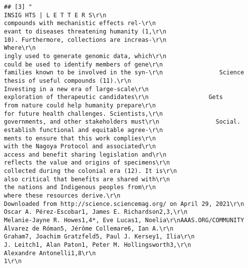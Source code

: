 \documentclass[
]{book}
\begin{document}
\begin{verbatim}
## [3] "                                                              INSIG HTS | L E T T E R S\r\n                                                              compounds with mechanistic effects rel-\r\n                                                              evant to diseases threatening humanity (1,\r\n                                                              10). Furthermore, collections are increas-\r\n                 Where\r\n                                                              ingly used to generate genomic data, which\r\n                                                              could be used to identify members of gene\r\n                                                              families known to be involved in the syn-\r\n                Science                                       thesis of useful compounds (11).\r\n                                                                 Investing in a new era of large-scale\r\n                                                              exploration of therapeutic candidates\r\n                 Gets                                         from nature could help humanity prepare\r\n                                                              for future health challenges. Scientists,\r\n                                                              governments, and other stakeholders must\r\n                Social.                                       establish functional and equitable agree-\r\n                                                              ments to ensure that this work complies\r\n                                                              with the Nagoya Protocol and associated\r\n                                                              access and benefit sharing legislation and\r\n                                                              reflects the value and origins of specimens\r\n                                                              collected during the colonial era (12). It is\r\n                                                              also critical that benefits are shared with\r\n                                                              the nations and Indigenous peoples from\r\n                                                              where these resources derive.\r\n                                                                                                                                  Downloaded from http://science.sciencemag.org/ on April 29, 2021\r\n                                                              Oscar A. Pérez-Escobar1, James E. Richardson2,3,\r\n                                                              Melanie-Jayne R. Howes1,4*, Eve Lucas1, Noelia\r\nAAAS.ORG/COMMUNITY                                            Álvarez de Róman5, Jérôme Collemare6, Ian A.\r\n                                                              Graham7, Joachim Gratzfeld5, Paul J. Kersey1, Ilia\r\n                                                              J. Leitch1, Alan Paton1, Peter M. Hollingsworth3,\r\n                                                              Alexandre Antonelli1,8\r\n                                                              1\r\n                                                    
\end{verbatim}
\end{document}
